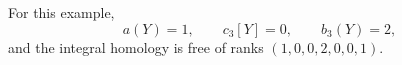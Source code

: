 
\begin{proposition}[P4.5]\hypertarget{tag-02XO}{}\label{night:P4.5}\label{stmt:P4.5}


For this example,
\[
 a(Y)=1,\qquad c_3[Y]=0,\qquad b_3(Y)=2,
\]
and the integral homology is free of ranks $(1,0,0,2,0,0,1)$.
\end{proposition}

